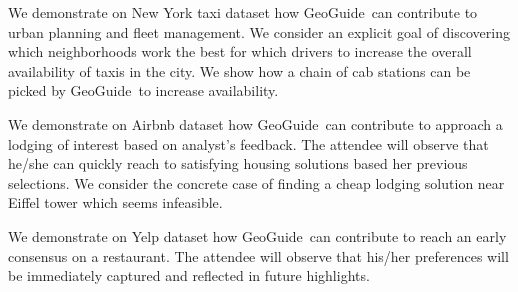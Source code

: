 \documentclass{vldb}
\newcommand{\framework}{{\sc GeoGuide}}
\begin{document}
\vspace{5pt}
 We demonstrate on New York taxi dataset how \framework\ can contribute to urban planning and fleet management. We consider an explicit goal of discovering which neighborhoods work the best for which drivers to increase the overall availability of taxis in the city. We show how a chain of cab stations can be picked by \framework\ to increase availability.

\vspace{5pt}
 We demonstrate on Airbnb dataset how \framework\ can contribute to approach a lodging of interest based on analyst's feedback. The attendee will observe that he/she can quickly reach to satisfying housing solutions based her previous selections. We consider the concrete case of finding a cheap lodging solution near Eiffel tower which seems infeasible.

\vspace{5pt}
 We demonstrate on Yelp dataset how \framework\ can contribute to reach an early consensus on a restaurant. The attendee will observe that his/her preferences will be immediately captured and reflected in future highlights.


\end{document}
